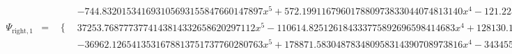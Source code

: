 \documentclass{article}
\begin{document}
\begin{landscape}
\begin{eqnarray*}
\begin{array}{cc}
\end{array}\\ 
\Psi_{\text{right},1} & = & \begin{array}{cc}
 \{ & 
\begin{array}{cc}
 -744.832015341693105693155847660147897 x^5+572.199116796017880973833044074813140 x^4-121.223436994302465278711324223302533 x^3+6.28375850006296911565888524202639313 x^2 & x\geq 0\land x<\frac{1}{2} \\
 37253.7687773774143814332658620297112 x^5-110614.825126184333775892696598414683 x^4+128130.148235323273067415772521180281 x^3-72223.3873553102545379454821546825673 x^2+19760.0917333375905962465361928385733 x-2092.31680684211299336333589288580073 & x\geq \frac{1}{2}\land x<\frac{3}{4} \\
 -36962.1265413531678813751737760280763 x^5+178871.583048783480958314390708973816 x^4-343455.676455829632121309254147544387 x^3+327119.553814211227222069530409981036 x^2-154549.689008921800431318295710755938 x+28976.3551431098922536188025153735491 & x\geq \frac{3}{4}\land x<1
\end{array}

\end{array}\end{eqnarray*}
\end{landscape}
\end{document}

